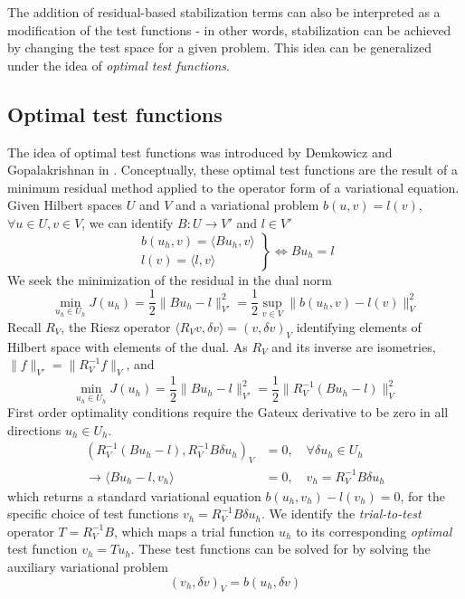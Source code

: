 \documentclass[11pt,onecolumn]{scrartcl}
\begin{document}
The addition of residual-based stabilization terms can also be interpreted as a modification of the test functions - in other words, stabilization can be achieved by changing the test space for a given problem.  This idea can be generalized under the idea of \textit{optimal test functions}.  


\subsection{Optimal test functions}
The idea of optimal test functions was introduced by Demkowicz and Gopalakrishnan in \cite{DPG2}.  Conceptually, these optimal test functions are the result of a minimum residual method applied to the operator form of a variational equation.  Given Hilbert spaces $U$ and $V$ and a variational problem $b(u,v) = l(v)$, $\forall u\in U, v\in V$, we can identify $B:U\rightarrow V'$ and $l \in V'$ 
\[
\left.\begin{array}{c}
b(u_h,v) = \langle Bu_h,v\rangle  \\
l(v) = \langle l,v\rangle
\end{array}\right\}
\Longleftrightarrow Bu_h = l
\]
We seek the minimization of the residual in the dual norm
\[
\min_{u_h\in U_h} J(u_h) = \frac{1}{2}\|Bu_h-l\|_{V'}^2 = \frac{1}{2} \sup_{v\in V} \| b(u_h,v)-l(v)\|_{V}^2
\]
Recall $R_V$, the Riesz operator $\langle R_V v,\delta v\rangle = (v, \delta v)_V$ identifying elements of Hilbert space with elements of the dual.  As $R_V$ and its inverse are isometries, $\|f\|_{V'} = \|R_V^{-1} f\|_V$, and 
\[
\min_{u_h\in U_h} J(u_h) = \frac{1}{2}\|Bu_h-l\|_{V'}^2 =  \frac{1}{2}\|R_V^{-1}(Bu_h-l)\|_V^2
\]
First order optimality conditions require the Gateux derivative to be zero in all directions $u_h \in U_h$.  
\begin{align*}
\left(R_V^{-1}(Bu_h-l),R_V^{-1}B\delta u_h\right)_V &= 0, \quad \forall \delta u_h \in U_h \\
\rightarrow \langle Bu_h-l, v_h\rangle &= 0, \quad v_h = R_V^{-1}B\delta u_h
\end{align*}
which returns a standard variational equation $b(u_h,v_h) - l(v_h) = 0$, for the specific choice of test functions $v_h = R_V^{-1}B\delta u_h$.  We identify the \textit{trial-to-test} operator $T = R_V^{-1}B$, which maps a trial function $u_h$ to its corresponding \textit{optimal} test function $v_h = Tu_h$.  These test functions can be solved for by solving the auxiliary variational problem
\[
\left(v_h,\delta v\right)_V = b(u_h,\delta v)
\]
\end{document}
